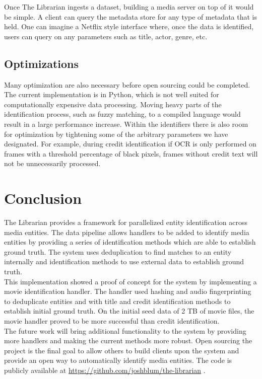 \documentclass[paper=a4, fontsize=11pt]{scrartcl} %
\numberwithin{equation}{section} %
\numberwithin{figure}{section} %
\numberwithin{table}{section} %
\begin{document}
Once The Librarian ingests a dataset, building a media server on top of it would be simple. A client can query the metadata store for any type of metadata that is held. One can imagine a Netflix style interface where, once the data is identified, users can query on any parameters such as title, actor, genre, etc. \\

\subsection{Optimizations}
\label{sec:optimizations}
Many optimization are also necessary before open sourcing could be completed. The current implementation is in Python, which is not well suited for computationally expensive data processing. Moving heavy parts of the identification process, such as fuzzy matching, to a compiled language would result in a large performance increase. Within the identifiers there is also room for optimization by tightening some of the arbitrary parameters we have designated. For example, during credit identification if OCR is only performed on frames with a threshold percentage of black pixels, frames without credit text will not be unnecessarily processed. \\


\section{Conclusion}
\label{sec:conclusion}

The Librarian provides a framework for parallelized entity identification across media entities. The data pipeline allows handlers to be added to identify media entities by providing a series of identification methods which are able to establish ground truth. The system uses deduplication to find matches to an entity internally and identification methods to use external data to establish ground truth. \\

This implementation showed a proof of concept for the system by implementing a movie identification handler. The handler used hashing and audio fingerprinting to deduplicate entities and with title and credit identification methods to establish initial ground truth. On the initial seed data of 2 TB of movie files, the movie handler proved to be more successful than credit identification. \\

The future work will bring additional functionality to the system by providing more handlers and making the current methods more robust. Open sourcing the project is the final goal to allow others to build clients upon the system and provide an open way to automatically identify media entities. The code is publicly available at \url{https://github.com/joshblum/the-librarian} .\\

\end{document}
